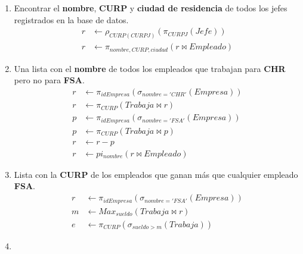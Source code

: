 \documentclass{article}
\begin{document}
\begin{enumerate}
{{\begin{enumerate}
{\begin{align*}
                        \end{align*}
                    }
                    \item {
                        Encontrar el \textbf{nombre}, \textbf{CURP} y
                        \textbf{ciudad de residencia} de todos los jefes
                        registrados en la base de datos.
                        \begin{align*}
                            r &\leftarrow \rho_{CURP(CURPJ)}(\pi_{CURPJ}(Jefe)) \\
                            r &\leftarrow \pi_{nombre, CURP, ciudad}(r \bowtie Empleado)
                        \end{align*}
                    }
                    \item {
                        Una lista con el \textbf{nombre} de todos los empleados
                        que trabajan para  \textbf{CHR} pero no para
                        \textbf{FSA}.
                        \begin{align*}
                            r &\leftarrow \pi_{idEmpresa}(\sigma_{nombre = 'CHR'}(Empresa)) \\
                            r &\leftarrow \pi_{CURP}(Trabaja \bowtie r) \\
                            p &\leftarrow \pi_{idEmpresa}(\sigma_{nombre = 'FSA'}(Empresa)) \\
                            p &\leftarrow \pi_{CURP}(Trabaja \bowtie p) \\
                            r &\leftarrow r - p \\
                            r &\leftarrow pi_{nombre}(r \bowtie Empleado)
                        \end{align*}
                    }
                    \item {
                        Lista con la \textbf{CURP} de los empleados que ganan
                        más que cualquier empleado \textbf{FSA}.
                        \begin{align*}
                            r &\leftarrow \pi_{idEmpresa}(\sigma_{nombre = 'FSA'}(Empresa)) \\
                            m &\leftarrow Max_{sueldo}(Trabaja \bowtie r) \\
                            e &\leftarrow \pi_{CURP}(\sigma_{sueldo>m}(Trabaja))
                        \end{align*}
                    }
                    \item {
}
\end{enumerate}}}
\end{enumerate}
\end{document}
